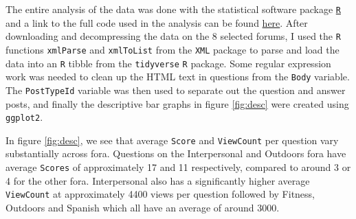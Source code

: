 \documentclass[11pt,preprint, authoryear]{article}
\numberwithin{equation}{section}
\numberwithin{figure}{section}
\numberwithin{table}{section}
\begin{document}
The entire analysis of the data was done with the statistical software
package \href{https://cran.r-project.org}{\texttt{R}} and a link to the
full code used in the analysis can be found
\href{https://github.com/BCallumCarr/msc-lse-thesis/tree/master/01-r-code}{here}.
After downloading and decompressing the data on the 8 selected forums, I
used the \texttt{R} functions \texttt{xmlParse} and \texttt{xmlToList}
from the \texttt{XML} package to parse and load the data into an
\texttt{R} tibble from the \texttt{tidyverse} \texttt{R} package. Some
regular expression work was needed to clean up the HTML text in
questions from the \texttt{Body} variable. The \texttt{PostTypeId}
variable was then used to separate out the question and answer posts,
and finally the descriptive bar graphs in figure \ref{fig:desc} were
created using \texttt{ggplot2}.

In figure \ref{fig:desc}, we see that average \texttt{Score} and
\texttt{ViewCount} per question vary substantially across fora.
Questions on the Interpersonal and Outdoors fora have average
\texttt{Scores} of approximately 17 and 11 respectively, compared to
around 3 or 4 for the other fora. Interpersonal also has a significantly
higher average \texttt{ViewCount} at approximately 4400 views per
question followed by Fitness, Outdoors and Spanish which all have an
average of around 3000.

\renewcommand{\thefigure}{\arabic{figure}}

\footnotesize
\end{document}
